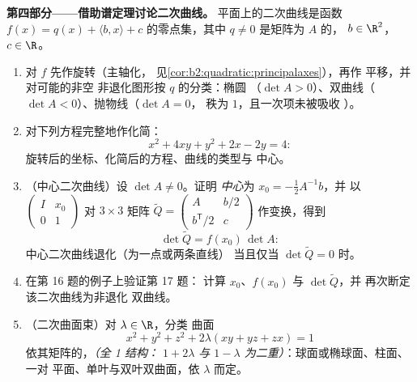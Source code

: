 \begin{problem}
\medskip
\noindent\textbf{第四部分——借助谱定理讨论二次曲线。}
平面上的二次曲线是函数 $f(x) = q(x) + \langle b,
x\rangle + c$ 的零点集，其中 $q \neq 0$ 是矩阵为 $A$ 的，
$b \in \R^2$，$c \in \R$。
\begin{enumerate}[resume]
  \item 对 $f$ 先作旋转（主轴化，
        见\cref{cor:b2:quadratic:principalaxes}），再作
        平移，并对可能的非空
        非退化图形按 $q$ 的分类：椭圆
        （$\det A > 0$）、双曲线（$\det A < 0$）、抛物线（$\det A = 0$，
        秩为 $1$，且一次项未被吸收
        ）。
  \item 对下列方程完整地作化简：
        \[
        x^2 + 4xy + y^2 + 2x - 2y = 4 :
        \]
        旋转后的坐标、化简后的方程、曲线的类型与
        中心。
  \item （中心二次曲线）设 $\det A \neq 0$。证明
        \emph{中心}为 $x_0 = -\frac12 A^{-1}b$，并
        以 $\begin{pmatrix} I & x_0\\ 0 &
        1\end{pmatrix}$ 对 $3\times3$ 矩阵 $\widetilde Q
        = \begin{pmatrix} A & b/2 \\ b^{\mathsf T}/2 &
        c\end{pmatrix}$ 作变换，得到
        \[
        \det\widetilde Q = f(x_0)\,\det A :
        \]
        中心二次曲线退化（为一点或两条直线）
        当且仅当 $\det\widetilde Q = 0$ 时。
  \item 在第 16 题的例子上验证第 17 题：
        计算 $x_0$、$f(x_0)$ 与 $\det\widetilde Q$，并
        再次断定该二次曲线为非退化
        双曲线。
  \item （二次曲面束）对 $\lambda \in \R$，分类
        曲面
        \[
        x^2 + y^2 + z^2 + 2\lambda(xy + yz + zx) = 1
        \]
        依其矩阵的，\emph{（全 1 结构：
         $1 + 2\lambda$ 与 $1 -
        \lambda$ 为二重）}：球面或椭球面、柱面、一对
        平面、单叶与双叶双曲面，依
        $\lambda$ 而定。
\end{enumerate}


\end{problem}
